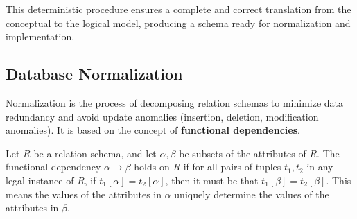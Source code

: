 This deterministic procedure ensures a complete and correct translation from the conceptual to the logical model, producing a schema ready for normalization and implementation.

\subsection{Database Normalization}
Normalization is the process of decomposing relation schemas to minimize data redundancy and avoid update anomalies (insertion, deletion, modification anomalies). It is based on the concept of \textbf{functional dependencies}.

\begin{definition}
Let $R$ be a relation schema, and let $\alpha, \beta$ be subsets of the attributes of $R$. The functional dependency $\alpha \to \beta$ holds on $R$ if for all pairs of tuples $t_1, t_2$ in any legal instance of $R$, if $t_1[\alpha] = t_2[\alpha]$, then it must be that $t_1[\beta] = t_2[\beta]$. This means the values of the attributes in $\alpha$ uniquely determine the values of the attributes in $\beta$.
\end{definition}

